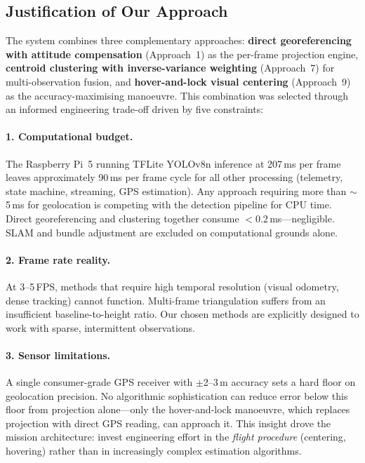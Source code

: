 \FloatBarrier
\subsection{Justification of Our Approach}\label{sec:approach-justification}

The system combines three complementary approaches: \textbf{direct georeferencing with attitude compensation} (Approach~1) as the per-frame projection engine, \textbf{centroid clustering with inverse-variance weighting} (Approach~7) for multi-observation fusion, and \textbf{hover-and-lock visual centering} (Approach~9) as the accuracy-maximising manoeuvre.  This combination was selected through an informed engineering trade-off driven by five constraints:

\paragraph{1. Computational budget.}
The Raspberry Pi~5 running TFLite YOLOv8n inference at 207\,ms per frame leaves approximately 90\,ms per frame cycle for all other processing (telemetry, state machine, streaming, GPS estimation).  Any approach requiring more than $\sim$5\,ms for geolocation is competing with the detection pipeline for CPU time.  Direct georeferencing and clustering together consume $<$0.2\,ms---negligible.  SLAM and bundle adjustment are excluded on computational grounds alone.

\paragraph{2. Frame rate reality.}
At 3--5\,FPS, methods that require high temporal resolution (visual odometry, dense tracking) cannot function.  Multi-frame triangulation suffers from an insufficient baseline-to-height ratio.  Our chosen methods are explicitly designed to work with sparse, intermittent observations.

\paragraph{3. Sensor limitations.}
A single consumer-grade GPS receiver with $\pm$2--3\,m accuracy sets a hard floor on geolocation precision.  No algorithmic sophistication can reduce error below this floor from projection alone---only the hover-and-lock manoeuvre, which replaces projection with direct GPS reading, can approach it.  This insight drove the mission architecture: invest engineering effort in the \emph{flight procedure} (centering, hovering) rather than in increasingly complex estimation algorithms.

